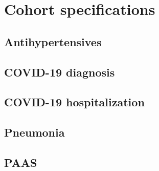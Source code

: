 \documentclass[11pt,]{article}
\begin{document}
\hypertarget{cohort-specifications}{%
\section{Cohort specifications}\label{cohort-specifications}}

\hypertarget{antihypertensives}{%
\subsection{Antihypertensives}\label{antihypertensives}}

\hypertarget{covid-19-diagnosis}{%
\subsection{COVID-19 diagnosis}\label{covid-19-diagnosis}}

\hypertarget{covid-19-hospitalization}{%
\subsection{COVID-19 hospitalization}\label{covid-19-hospitalization}}

\hypertarget{pneumonia-1}{%
\subsection{Pneumonia}\label{pneumonia-1}}

\hypertarget{paas}{%
\subsection{PAAS}\label{paas}}
\end{document}
